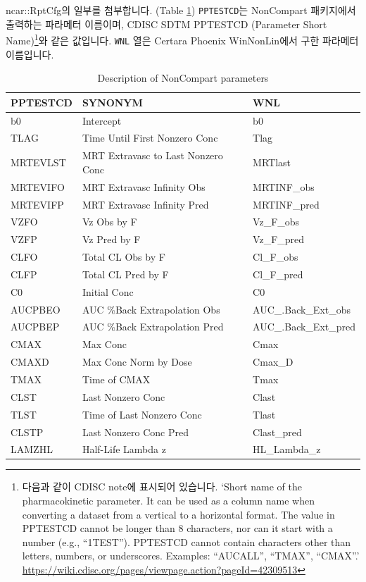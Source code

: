 \documentclass[12pt,]{krantz}
\let\rmarkdownfootnote\footnote%
\def\footnote{\protect\rmarkdownfootnote}
\theoremstyle{definition}
\theoremstyle{definition}
\theoremstyle{definition}
\theoremstyle{remark}
\begin{document}
ncar::RptCfg의 일부를 첨부합니다. (Table \ref{tab:rptcfg})
\texttt{PPTESTCD}는 NonCompart 패키지에서 출력하는 파라메터 이름이며,
CDISC SDTM PPTESTCD (Parameter Short Name)\footnote{다음과 같이 CDISC
  note에 표시되어 있습니다. `Short name of the pharmacokinetic
  parameter. It can be used as a column name when converting a dataset
  from a vertical to a horizontal format. The value in PPTESTCD cannot
  be longer than 8 characters, nor can it start with a number (e.g.,
  ``1TEST''). PPTESTCD cannot contain characters other than letters,
  numbers, or underscores. Examples: ``AUCALL'', ``TMAX'', ``CMAX''.'
  \url{https://wiki.cdisc.org/pages/viewpage.action?pageId=42309513}}와
같은 값입니다. \texttt{WNL} 열은 Certara Phoenix WinNonLin에서 구한
파라메터 이름입니다.

\begin{longtable}[t]{lll}
\caption{\label{tab:rptcfg}Description of NonCompart parameters}\\
\toprule
PPTESTCD & SYNONYM & WNL\\
\midrule
b0 & Intercept & b0\\
TLAG & Time Until First Nonzero Conc & Tlag\\
MRTEVLST & MRT Extravasc to Last Nonzero Conc & MRTlast\\
MRTEVIFO & MRT Extravasc Infinity Obs & MRTINF\_obs\\
MRTEVIFP & MRT Extravasc Infinity Pred & MRTINF\_pred\\
\addlinespace
VZFO & Vz Obs by F & Vz\_F\_obs\\
VZFP & Vz Pred by F & Vz\_F\_pred\\
CLFO & Total CL Obs by F & Cl\_F\_obs\\
CLFP & Total CL Pred by F & Cl\_F\_pred\\
C0 & Initial Conc & C0\\
\addlinespace
AUCPBEO & AUC \%Back Extrapolation Obs & AUC\_.Back\_Ext\_obs\\
AUCPBEP & AUC \%Back Extrapolation Pred & AUC\_.Back\_Ext\_pred\\
CMAX & Max Conc & Cmax\\
CMAXD & Max Conc Norm by Dose & Cmax\_D\\
TMAX & Time of CMAX & Tmax\\
\addlinespace
CLST & Last Nonzero Conc & Clast\\
TLST & Time of Last Nonzero Conc & Tlast\\
CLSTP & Last Nonzero Conc Pred & Clast\_pred\\
LAMZHL & Half-Life Lambda z & HL\_Lambda\_z\\

\end{longtable}
\end{document}
